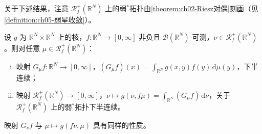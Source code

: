 \documentclass[../../main.tex]{subfiles}%
\begin{document}
关于下述结果，注意 $\mathscr{R}^+_f(\mathbb{R}^N)$ 上的弱$^*$拓扑由\cref{theorem:ch02-Riesz对偶}刻画（见\cref{definition:ch05-弱星收敛}）。

\begin{lemma}\label{lemma:ch03-位势下半连续}
设 $g$ 为 $\mathbb{R}^N\times\mathbb{R}^N$ 上的核，$f:\mathbb{R}^N\to[0,\infty]$ 非负且 $\mathcal{B}(\mathbb{R}^N)$-可测，$\nu\in\mathscr{R}^+_f(\mathbb{R}^N)$。则对任意 $\mu\in\mathscr{R}^+_f(\mathbb{R}^N)$：
\begin{enumerate}[(i)]
\item 映射 $G_\mu f:\mathbb{R}^N\to[0,\infty]$，$(G_\mu f)(x)=\int_{\mathbb{R}^N}g(x,y)f(y)\,\mathrm{d}\mu(y)$，下半连续；
\item 映射 $\mathscr{R}^+_f(\mathbb{R}^N)\to[0,\infty]$，$\nu\mapsto g(\nu,f\mu)=\int_{\mathbb{R}^N}(G_\mu f)\,\mathrm{d}\nu$，关于 $\mathscr{R}^+_f(\mathbb{R}^N)$ 上的弱$^*$拓扑下半连续。
\end{enumerate}
映射 $G_\nu f$ 与 $\mu\mapsto g(f\nu,\mu)$ 具有同样的性质。
\end{lemma}
\end{document}
